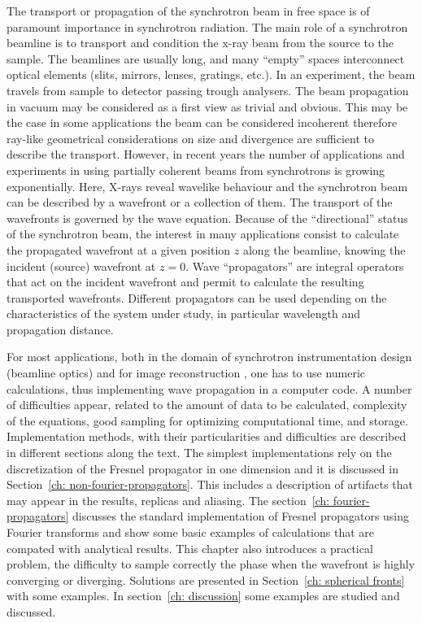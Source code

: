 \documentclass{iucr}              %
\begin{document}
The transport or propagation of the synchrotron beam in free space is of paramount importance in synchrotron radiation. 
The main role of a synchrotron beamline is to transport and condition the x-ray beam from the source to the sample. The beamlines are usually long, and many ``empty'' spaces interconnect optical elements (slits, mirrors, lenses, gratings, etc.). In an experiment, the beam travels from sample to detector passing trough analysers. The beam propagation in vacuum may be considered as a first view as trivial and obvious. This may be the case in some applications the beam can be considered incoherent therefore ray-like geometrical considerations on size and divergence are sufficient to describe the transport. 
However, in recent years the number of applications and experiments in using partially coherent beams from synchrotrons is growing exponentially. Here, X-rays reveal wavelike behaviour and the synchrotron beam can be described by a wavefront or a collection of them. The transport of the wavefronts is governed by the wave equation. Because of the ``directional'' status of the synchrotron beam, the interest in many applications consist to calculate the propagated wavefront at a given position $z$ along the beamline, knowing the incident (source) wavefront at $z=0$. Wave ``propagators'' are integral operators that act on the incident wavefront and permit to calculate the resulting transported wavefronts. Different propagators can be used depending on the characteristics of the system under study, in particular wavelength and propagation distance. 

For most applications, both in the domain of synchrotron instrumentation design (beamline optics) and for image reconstruction \cite{maiden_josaa_2012,gilles_optica_2018}, one has to use numeric calculations, thus implementing wave propagation in a computer code. A number of difficulties appear, related to the amount of data to be calculated, complexity of the equations, good sampling for optimizing computational time, and storage. Implementation methods, with their particularities and difficulties are described in different sections along the text. The simplest implementations rely on the discretization of the Fresnel propagator in one dimension and it is discussed in Section~\ref{ch: non-fourier-propagators}. This includes a description of artifacts that may appear in the results, replicas and aliasing. The section~\ref{ch: fourier-propagators} discusses the standard implementation of Fresnel propagators using Fourier transforms and show some basic examples of calculations that are compated with analytical results. This chapter also introduces a practical problem, the difficulty to sample correctly the phase when the wavefront is highly converging or diverging. Solutions are presented in Section~\ref{ch: spherical fronts} with some examples. In section~\ref{ch: discussion} some examples are studied and discussed.
\end{document}
